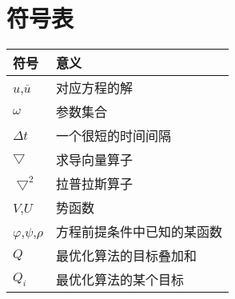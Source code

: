 \documentclass[oneside,10pt]{article}
\begin{document}
\section{符号表}

\begin{center}
\begin{tabular}{l|l}
    \hline
    符号 & 意义\\ \hline
    $u$,$\overline{u}$  & 对应方程的解\\
    $\omega$ & 参数集合\\
    $\Delta t$&一个很短的时间间隔\\
    $\bigtriangledown$&求导向量算子\\
    $\bigtriangledown^2$& 拉普拉斯算子\\
    $V$,$U$&势函数\\
    $\varphi $,$\psi $,$\rho $& 方程前提条件中已知的某函数\\
    $Q$&最优化算法的目标叠加和\\
    $Q_i$&最优化算法的某个目标\\
    \hline
\end{tabular} 
\end{center}
\end{document}
